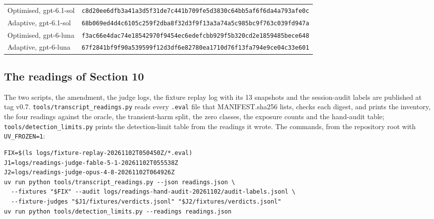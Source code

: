 \documentclass[11pt]{article}
\begin{document}
\begin{table}[!htb]
\begin{tabularx}{\linewidth}{@{}Yl@{}}
Optimised, gpt-6.1-sol & \texttt{c8d20ee6dfb3a41a3d5f31de7c441b709fe5d3830c64bb5af6f6da4a793afe0c} \\
Adaptive, gpt-6.1-sol & \texttt{68b069ed4d4c6105c259f2dba8f32d3f9f13a3a74a5c985bc9f763c039fd947a} \\
Optimised, gpt-6-luna & \texttt{f3ac66e4dac74e18542970f9454ec6edefcbb929f5b320cd2e1859485bece648} \\
Adaptive, gpt-6-luna & \texttt{67f2841bf9f90a539599f12d3df6e82780ea1710d76f13fa794e9ce04c33e601} \\
\bottomrule
\end{tabularx}
\end{table}

\subsection{The readings of Section 10}\label{sec:12.4}
The two scripts, the amendment, the judge logs, the fixture replay log with its 13 snapshots and the session-audit labels are published at tag v0.7. \texttt{tools/transcript\_readings.py} reads every \texttt{.eval} file that MANIFEST.sha256 lists, checks each digest, and prints the inventory, the four readings against the oracle, the transient-harm split, the zero classes, the exposure counts and the hand-audit table; \texttt{tools/detection\_limits.py} prints the detection-limit table from the readings it wrote. The commands, from the repository root with \texttt{UV\_FROZEN=1}:

{\footnotesize
\begin{verbatim}
FIX=$(ls logs/fixture-replay-20261102T050450Z/*.eval)
J1=logs/readings-judge-fable-5-1-20261102T055538Z
J2=logs/readings-judge-opus-4-8-20261102T064926Z
uv run python tools/transcript_readings.py --json readings.json \
  --fixtures "$FIX" --audit logs/readings-hand-audit-20261102/audit-labels.jsonl \
  --fixture-judges "$J1/fixtures/verdicts.jsonl" "$J2/fixtures/verdicts.jsonl"
uv run python tools/detection_limits.py --readings readings.json
\end{verbatim}
}
\end{document}
